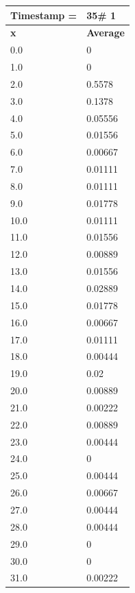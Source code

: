 \begin{tabular}{|l||l|}
\hline
\textbf{Timestamp =} & \textbf{35}\# 1\\\hline
	\textbf{x} & \textbf{Average} \\ \hline
\hline
	0.0 & 0 \\ \hline
	1.0 & 0 \\ \hline
	2.0 & 0.5578 \\ \hline
	3.0 & 0.1378 \\ \hline
	4.0 & 0.05556 \\ \hline
	5.0 & 0.01556 \\ \hline
	6.0 & 0.00667 \\ \hline
	7.0 & 0.01111 \\ \hline
	8.0 & 0.01111 \\ \hline
	9.0 & 0.01778 \\ \hline
	10.0 & 0.01111 \\ \hline
	11.0 & 0.01556 \\ \hline
	12.0 & 0.00889 \\ \hline
	13.0 & 0.01556 \\ \hline
	14.0 & 0.02889 \\ \hline
	15.0 & 0.01778 \\ \hline
	16.0 & 0.00667 \\ \hline
	17.0 & 0.01111 \\ \hline
	18.0 & 0.00444 \\ \hline
	19.0 & 0.02 \\ \hline
	20.0 & 0.00889 \\ \hline
	21.0 & 0.00222 \\ \hline
	22.0 & 0.00889 \\ \hline
	23.0 & 0.00444 \\ \hline
	24.0 & 0 \\ \hline
	25.0 & 0.00444 \\ \hline
	26.0 & 0.00667 \\ \hline
	27.0 & 0.00444 \\ \hline
	28.0 & 0.00444 \\ \hline
	29.0 & 0 \\ \hline
	30.0 & 0 \\ \hline
	31.0 & 0.00222 \\ \hline
\end{tabular}

